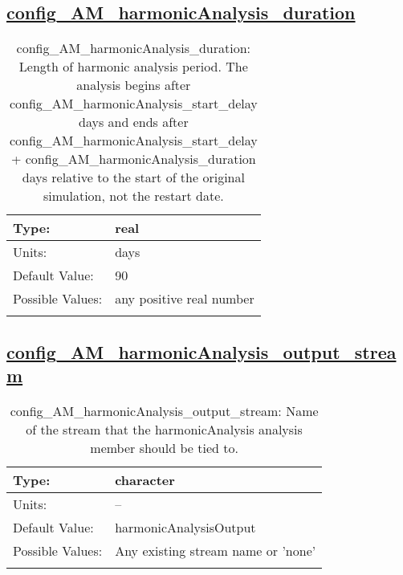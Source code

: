\subsection[config\_AM\_harmonicAnalysis\_duration]{\hyperref[sec:nm_tab_AM_harmonicAnalysis]{config\_AM\_harmonicAnalysis\_duration}}
\label{subsec:nm_sec_config_AM_harmonicAnalysis_duration}
\begin{center}
\begin{longtable}{| p{2.0in} || p{4.0in} |}
    \hline
    Type: & real \\
    \hline
    Units: & \si{days} \\
    \hline
    Default Value: & 90 \\
    \hline
    Possible Values: & any positive real number \\
    \hline
    \caption{config\_AM\_harmonicAnalysis\_duration: Length of harmonic analysis period. The analysis begins after config\_AM\_harmonicAnalysis\_start\_delay days and ends after config\_AM\_harmonicAnalysis\_start\_delay + config\_AM\_harmonicAnalysis\_duration days relative to the start of the original simulation, not the restart date.}
\end{longtable}
\end{center}
\subsection[config\_AM\_harmonicAnalysis\_output\_stream]{\hyperref[sec:nm_tab_AM_harmonicAnalysis]{config\_AM\_harmonicAnalysis\_output\_stream}}
\label{subsec:nm_sec_config_AM_harmonicAnalysis_output_stream}
\begin{center}
\begin{longtable}{| p{2.0in} || p{4.0in} |}
    \hline
    Type: & character \\
    \hline
    Units: & -- \\
    \hline
    Default Value: & harmonicAnalysisOutput \\
    \hline
    Possible Values: & Any existing stream name or 'none' \\
    \hline
    \caption{config\_AM\_harmonicAnalysis\_output\_stream: Name of the stream that the harmonicAnalysis analysis member should be tied to.}
\end{longtable}
\end{center}
